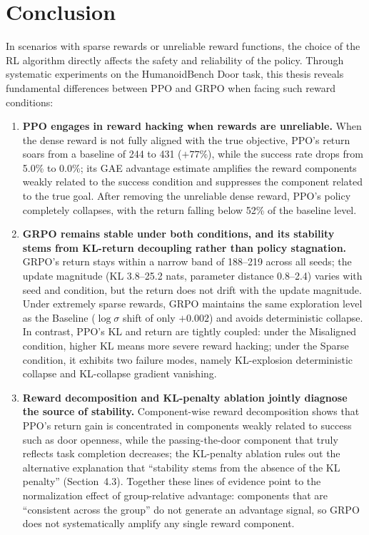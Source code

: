 \chapter{Conclusion} \label{Chap6}

In scenarios with sparse rewards or unreliable reward functions, the choice of the RL algorithm directly affects the safety and reliability of the policy. Through systematic experiments on the HumanoidBench Door task, this thesis reveals fundamental differences between PPO and GRPO when facing such reward conditions:

\begin{enumerate}
  \item \textbf{PPO engages in reward hacking when rewards are unreliable.} When the dense reward is not fully aligned with the true objective, PPO's return soars from a baseline of 244 to 431 ($+77\%$), while the success rate drops from 5.0\% to 0.0\%; its GAE advantage estimate amplifies the reward components weakly related to the success condition and suppresses the component related to the true goal. After removing the unreliable dense reward, PPO's policy completely collapses, with the return falling below 52\% of the baseline level.

  \item \textbf{GRPO remains stable under both conditions, and its stability stems from KL-return decoupling rather than policy stagnation.} GRPO's return stays within a narrow band of 188--219 across all seeds; the update magnitude (KL 3.8--25.2 nats, parameter distance 0.8--2.4) varies with seed and condition, but the return does not drift with the update magnitude. Under extremely sparse rewards, GRPO maintains the same exploration level as the Baseline ($\log\sigma$ shift of only $+0.002$) and avoids deterministic collapse. In contrast, PPO's KL and return are tightly coupled: under the Misaligned condition, higher KL means more severe reward hacking; under the Sparse condition, it exhibits two failure modes, namely KL-explosion deterministic collapse and KL-collapse gradient vanishing.

  \item \textbf{Reward decomposition and KL-penalty ablation jointly diagnose the source of stability.} Component-wise reward decomposition shows that PPO's return gain is concentrated in components weakly related to success such as door openness, while the passing-the-door component that truly reflects task completion decreases; the KL-penalty ablation rules out the alternative explanation that ``stability stems from the absence of the KL penalty'' (Section~4.3). Together these lines of evidence point to the normalization effect of group-relative advantage: components that are ``consistent across the group'' do not generate an advantage signal, so GRPO does not systematically amplify any single reward component.


\end{enumerate}
